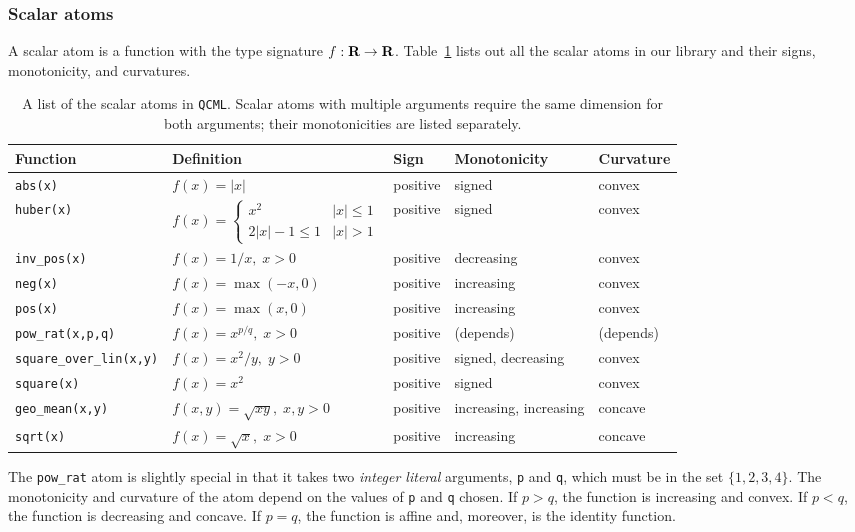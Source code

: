 \documentclass[11pt]{article}
\def\qcml{\texttt{QCML}\xspace}
\newcommand{\reals}{{\mbox{\bf R}}}
\begin{document}
\subsubsection{Scalar atoms}
A scalar atom is a function with the type signature $f : \reals \to \reals$.
Table~\ref{t-scalar-atoms} lists out all the scalar atoms in our library
and their signs, monotonicity, and curvatures.
\begin{table}
  \small
  \renewcommand{\arraystretch}{1.5}
  \centering
\begin{tabular}{|l|l||l|l|l|} \hline
  Function & Definition & Sign & Monotonicity & Curvature \\ \hline
  {\tt abs(x)} & $f(x) = |x|$ & positive & signed & convex \\ \hline
  {\tt huber(x)} & $f(x) = \begin{cases} x^2 & |x| \leq 1 \\
    2|x| - 1 \leq 1 & |x| > 1 \end{cases}$ & positive & signed & convex \\ \hline
  {\tt inv\_pos(x)} & $f(x) = 1/x, \; x > 0$ & positive & decreasing & convex \\ \hline
  {\tt neg(x)} & $f(x) = \max(-x, 0)$ & positive & increasing & convex \\ \hline
  {\tt pos(x)} & $f(x) = \max(x, 0)$ & positive & increasing & convex \\ \hline
  {\tt pow\_rat(x,p,q)} & $f(x) = x^{p/q}, \; x >0$ & positive & (depends) & (depends) \\ \hline
  {\tt square\_over\_lin(x,y)} & $f(x) = x^2/y, \; y >0$ & positive & signed, decreasing & convex\\ \hline
  {\tt square(x)} & $f(x) = x^2$ & positive & signed & convex\\ \hline
  {\tt geo\_mean(x,y)} & $f(x,y) = \sqrt{xy}, \; x,y >0$ & positive & increasing, increasing & concave \\ \hline
  {\tt sqrt(x)} & $f(x) = \sqrt{x}, \; x >0$ & positive & increasing & concave \\ \hline
\end{tabular}
\caption{A list of the scalar atoms in \qcml. Scalar atoms with multiple arguments
require the same dimension for both arguments; their monotonicities are listed separately.}
\label{t-scalar-atoms}
\end{table}

The {\tt pow\_rat} atom is slightly special in that it takes two \emph{integer
literal} arguments, {\tt p} and {\tt q}, which must be in the set $\{1,2,3,4\}$.
The monotonicity and curvature of the atom depend on the values of {\tt p}
and {\tt q} chosen. If $p > q$, the function is increasing and convex.
If $p < q$, the function is decreasing and concave. If $p = q$, the function
is affine and, moreover, is the identity function.
\end{document}
